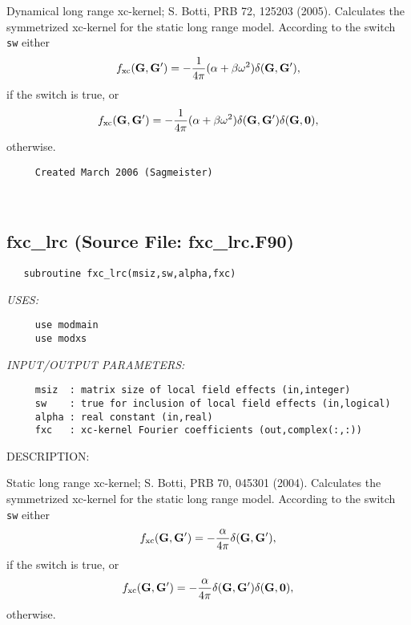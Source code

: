 \documentclass[11pt]{article}
\begin{document}
     Dynamical long range xc-kernel; S. Botti, PRB 72, 125203 (2005).
     Calculates the symmetrized xc-kernel for the static long range model.
     According to the switch {\tt sw} either $$
           f_{\rm xc}({\bf G},{\bf G'}) = - \frac{1}{4\pi} (\alpha+\beta\omega^2)
           \delta({\bf G},{\bf G'}), $$
     if the switch is true, or $$
           f_{\rm xc}({\bf G},{\bf G'}) = - \frac{1}{4\pi} (\alpha+\beta\omega^2)
           \delta({\bf G},{\bf G'})\delta({\bf G},{\bf 0}), $$
     otherwise.
  
\begin{verbatim}     Created March 2006 (Sagmeister)\end{verbatim}


 
 
\mbox{}\hrulefill\ 
 
\subsection{fxc\_lrc (Source File: fxc\_lrc.F90)}


\begin{verbatim}   subroutine fxc_lrc(msiz,sw,alpha,fxc)\end{verbatim}{\em USES:}
\begin{verbatim}     use modmain
     use modxs\end{verbatim}{\em INPUT/OUTPUT PARAMETERS:}
\begin{verbatim}     msiz  : matrix size of local field effects (in,integer)
     sw    : true for inclusion of local field effects (in,logical)
     alpha : real constant (in,real)
     fxc   : xc-kernel Fourier coefficients (out,complex(:,:))\end{verbatim}
{\sf DESCRIPTION:\\ }


     Static long range xc-kernel; S. Botti, PRB 70, 045301 (2004).
     Calculates the symmetrized xc-kernel for the static long range model.
     According to the switch {\tt sw} either $$
           f_{\rm xc}({\bf G},{\bf G'}) = - \frac{\alpha}{4\pi} 
           \delta({\bf G},{\bf G'}), $$
     if the switch is true, or $$
           f_{\rm xc}({\bf G},{\bf G'}) = - \frac{\alpha}{4\pi} 
           \delta({\bf G},{\bf G'})\delta({\bf G},{\bf 0}), $$
     otherwise.
  
\end{document}
